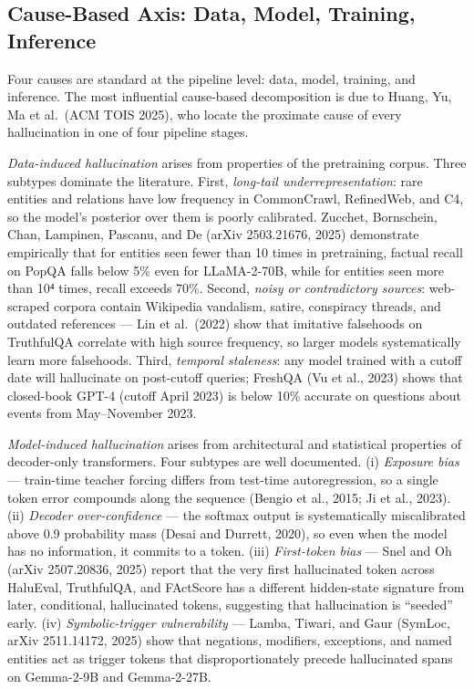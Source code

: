 \documentclass{article}
\begin{document}
\subsection{Cause-Based Axis: Data, Model, Training, Inference}\label{cause-based-axis-data-model-training-inference}

Four causes are standard at the pipeline level: data, model, training, and inference. The most influential cause-based decomposition is due to Huang, Yu, Ma et al.~(ACM TOIS 2025), who locate the proximate cause of every hallucination in one of four pipeline stages.

\emph{Data-induced hallucination} arises from properties of the pretraining corpus. Three subtypes dominate the literature. First, \emph{long-tail underrepresentation}: rare entities and relations have low frequency in CommonCrawl, RefinedWeb, and C4, so the model's posterior over them is poorly calibrated. Zucchet, Bornschein, Chan, Lampinen, Pascanu, and De (arXiv 2503.21676, 2025) demonstrate empirically that for entities seen fewer than 10 times in pretraining, factual recall on PopQA falls below 5\% even for LLaMA-2-70B, while for entities seen more than 10⁴ times, recall exceeds 70\%. Second, \emph{noisy or contradictory sources}: web-scraped corpora contain Wikipedia vandalism, satire, conspiracy threads, and outdated references --- Lin et al.~(2022) show that imitative falsehoods on TruthfulQA correlate with high source frequency, so larger models systematically learn more falsehoods. Third, \emph{temporal staleness}: any model trained with a cutoff date will hallucinate on post-cutoff queries; FreshQA (Vu et al., 2023) shows that closed-book GPT-4 (cutoff April 2023) is below 10\% accurate on questions about events from May--November 2023.

\emph{Model-induced hallucination} arises from architectural and statistical properties of decoder-only transformers. Four subtypes are well documented. (i) \emph{Exposure bias} --- train-time teacher forcing differs from test-time autoregression, so a single token error compounds along the sequence (Bengio et al., 2015; Ji et al., 2023). (ii) \emph{Decoder over-confidence} --- the softmax output is systematically miscalibrated above 0.9 probability mass (Desai and Durrett, 2020), so even when the model has no information, it commits to a token. (iii) \emph{First-token bias} --- Snel and Oh (arXiv 2507.20836, 2025) report that the very first hallucinated token across HaluEval, TruthfulQA, and FActScore has a different hidden-state signature from later, conditional, hallucinated tokens, suggesting that hallucination is ``seeded'' early. (iv) \emph{Symbolic-trigger vulnerability} --- Lamba, Tiwari, and Gaur (SymLoc, arXiv 2511.14172, 2025) show that negations, modifiers, exceptions, and named entities act as trigger tokens that disproportionately precede hallucinated spans on Gemma-2-9B and Gemma-2-27B.
\end{document}
